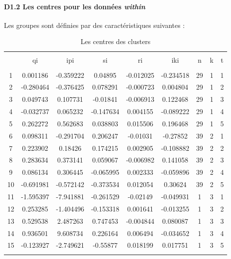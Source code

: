 \documentclass[11pt,]{article}
\let\oldparagraph\paragraph
\renewcommand{\paragraph}[1]{\oldparagraph{#1}\mbox{}}
\begin{document}
\FloatBarrier

\hypertarget{d1.2-les-centres-pour-les-donnees-within}{%
\paragraph{\texorpdfstring{D1.2 Les centres pour les données
\emph{within}}{D1.2 Les centres pour les données within}}\label{d1.2-les-centres-pour-les-donnees-within}}

Les groupes sont définies par des caractéristiques suivantes :

\FloatBarrier

\begin{table}[!htbp] \centering 
  \caption{Les centres des clusters} 
  \label{} 
\begin{tabular}{@{\extracolsep{5pt}} ccccccccc} 
\\[-1.8ex]\hline 
\hline \\[-1.8ex] 
 & qi & ipi & si & ri & iki & n & k & t \\ 
\hline \\[-1.8ex] 
1 & 0.001186 & -0.359222 & 0.04895 & -0.012025 & -0.234518 & 29 & 1 & 1 \\ 
2 & -0.280464 & -0.376425 & 0.078291 & -0.000723 & 0.004804 & 29 & 1 & 2 \\ 
3 & 0.049743 & 0.107731 & -0.01841 & -0.006913 & 0.122468 & 29 & 1 & 3 \\ 
4 & -0.032737 & 0.065232 & -0.147634 & 0.004155 & -0.089222 & 29 & 1 & 4 \\ 
5 & 0.262272 & 0.562683 & 0.038803 & 0.015506 & 0.196468 & 29 & 1 & 5 \\ 
6 & 0.098311 & -0.291704 & 0.206247 & -0.01031 & -0.27852 & 39 & 2 & 1 \\ 
7 & 0.223902 & 0.18426 & 0.174215 & 0.002905 & -0.108882 & 39 & 2 & 2 \\ 
8 & 0.283634 & 0.373141 & 0.059067 & -0.006982 & 0.141058 & 39 & 2 & 3 \\ 
9 & 0.086134 & 0.306445 & -0.065995 & 0.002333 & -0.059896 & 39 & 2 & 4 \\ 
10 & -0.691981 & -0.572142 & -0.373534 & 0.012054 & 0.30624 & 39 & 2 & 5 \\ 
11 & -1.595397 & -7.941881 & -0.261529 & -0.02149 & -0.049931 & 1 & 3 & 1 \\ 
12 & 0.253285 & -1.404496 & -0.153318 & 0.001641 & -0.013255 & 1 & 3 & 2 \\ 
13 & 0.529538 & 2.487263 & 0.747453 & -0.004844 & 0.080087 & 1 & 3 & 3 \\ 
14 & 0.936501 & 9.608734 & 0.226164 & 0.006494 & -0.034652 & 1 & 3 & 4 \\ 
15 & -0.123927 & -2.749621 & -0.55877 & 0.018199 & 0.017751 & 1 & 3 & 5 \\ 
\hline \\[-1.8ex] 
\end{tabular} 
\end{table}
\end{document}
